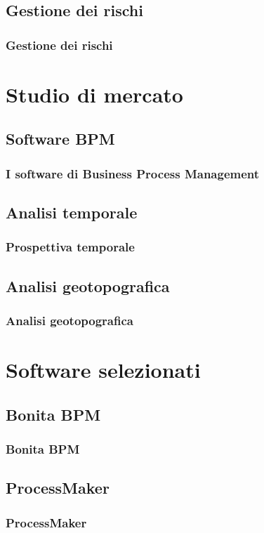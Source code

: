 \documentclass[compress,9pt]{beamer}
\begin{document}
\subsection{Gestione dei rischi}
\begin{frame}%
\frametitle{Gestione dei rischi}
\end{frame}

\section{Studio di mercato}
\subsection{Software BPM}
\begin{frame}%
\frametitle{I software di Business Process Management}
\end{frame}

\subsection{Analisi temporale}
\begin{frame}%
\frametitle{Prospettiva temporale}
\end{frame}

\subsection{Analisi geotopografica}
\begin{frame}%
\frametitle{Analisi geotopografica}
\end{frame}

\section{Software selezionati}
\newcommand{\progname}{Bonita BPM}
\subsection{\progname}
\begin{frame}%
\frametitle{\progname}
\end{frame}

\renewcommand{\progname}{ProcessMaker}
\subsection{\progname}
\begin{frame}%
\frametitle{\progname}
\end{frame}
\end{document}
